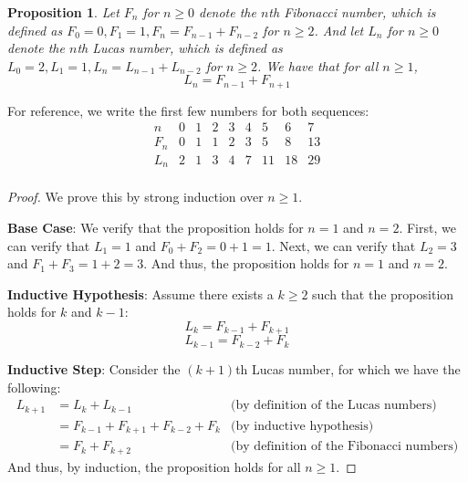 \documentclass{article}
\theoremstyle{plain}
\newtheorem{prop}{Proposition}
\theoremstyle{definition}
\begin{document}
\begin{prop}
    Let \(F_n\) for \(n \geq 0\) denote the \(n\)th Fibonacci number, which is defined as \(F_0 = 0, F_1 = 1, F_n = F_{n-1} + F_{n-2}\) for \(n \geq 2\). And let \(L_n\) for \(n \geq 0\) denote the \(n\)th Lucas number, which is defined as \(L_0 = 2, L_1 = 1, L_n = L_{n-1} + L_{n-2}\) for \(n \geq 2\). We have that for all \(n \geq 1\),
    \[L_n = F_{n-1} + F_{n+1}\]
\end{prop}

For reference, we write the first few numbers for both sequences:
\[\begin{array}{c|c|c|c|c|c|c|c|c}
    n   & 0 & 1 & 2 & 3 & 4 & 5 & 6 & 7 \\
    \hline \hline
    F_n & 0 & 1 & 1 & 2 & 3 & 5 & 8 & 13 \\
    \hline
    L_n & 2 & 1 & 3 & 4 & 7 & 11 & 18 & 29 \\
\end{array}\]

\begin{proof}
    We prove this by strong induction over \(n \geq 1\).
    
    \textbf{Base Case}: We verify that the proposition holds for \(n=1\) and \(n=2\). First, we can verify that \(L_1 = 1\) and \(F_0 + F_2 = 0 + 1 = 1\). Next, we can verify that \(L_2 = 3\) and \(F_1 + F_3 = 1 + 2 = 3\). And thus, the proposition holds for \(n=1\) and \(n=2\).

    \textbf{Inductive Hypothesis}: Assume there exists a \(k \geq 2\) such that the proposition holds for \(k\) and \(k-1\):
    \[L_k = F_{k-1} + F_{k+1}\]
    \[L_{k-1} = F_{k-2} + F_{k}\]

    \textbf{Inductive Step}: Consider the \((k+1)\)th Lucas number, for which we have the following:
    \[\begin{array}{rll}
        L_{k+1} \!\!\!\! &= L_{k} + L_{k-1} & \text{(by definition of the Lucas numbers)} \\
        &= F_{k-1} + F_{k+1} + F_{k-2} + F_{k} & \text{(by inductive hypothesis)} \\
        &= F_{k} + F_{k+2} & \text{(by definition of the Fibonacci numbers)}
    \end{array}\]
    And thus, by induction, the proposition holds for all \(n \geq 1\).
\end{proof}
\end{document}
